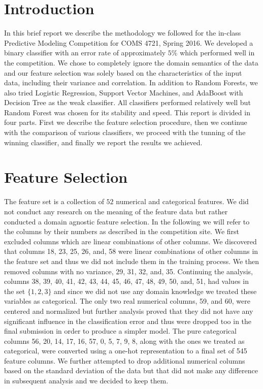 \documentclass[twoside,11pt]{homework}
\begin{document}
\maketitle

\section*{Introduction}

In this brief report we describe the methodology we followed for the in-class Predictive Modeling Competition for COMS 4721, Spring 2016. We developed a binary classifier with an error rate of approximately $5\%$ which performed well in the competition. We chose to completely ignore the domain semantics of the data and our feature selection was solely based on the
characteristics of the input data, including their variance and correlation. In addition to Random Forests, we also tried Logistic Regression, Support Vector Machines, and AdaBoost with Decision Tree as the weak classifier. All classifiers performed relatively well but Random Forest was chosen for its stability and speed. This report is divided in four parts. First we describe the feature selection procedure, then we continue with the comparison of various classifiers, we proceed with the tunning of the winning classifier, and finally we report the results we achieved. 


\section*{Feature Selection}


The feature set is a collection of $52$ numerical and categorical features. We did not conduct any research on the meaning of the feature data but rather conducted a domain agnostic feature selection. In the following we will refer to the columns by their numbers as described in the competition site. We first excluded columns which are linear combinations of other columns. We discovered that columns 18, 23, 25, 26, and, 58 were linear combinations of other columns in the feature set and thus we did not include them in the training process. We then removed columns with no variance, 29, 31, 32, and, 35. Continuing the analysis, columns 38, 39, 40, 41, 42, 43, 44, 45, 46, 47, 48, 49, 50, and, 51, had values in the set $\{1,2,3\}$ and since we did not use any domain knowledge we treated these variables as categorical. The only two real numerical columns, 59, and 60,  were centered and normalized but further analysis proved that they did not have any significant influence in the classification error and thus were dropped too in the final submission in order to produce a simpler model. The pure categorical columns 56, 20, 14, 17, 16, 57, 0, 5, 7, 9, 8, along with the ones we treated as categorical, were converted using a one-hot representation to a final set of 545 feature columns. We further attempted to drop additional numerical columns based on the standard deviation of the data but that did not make any difference in subsequent analysis and we decided to keep them.
\end{document}
